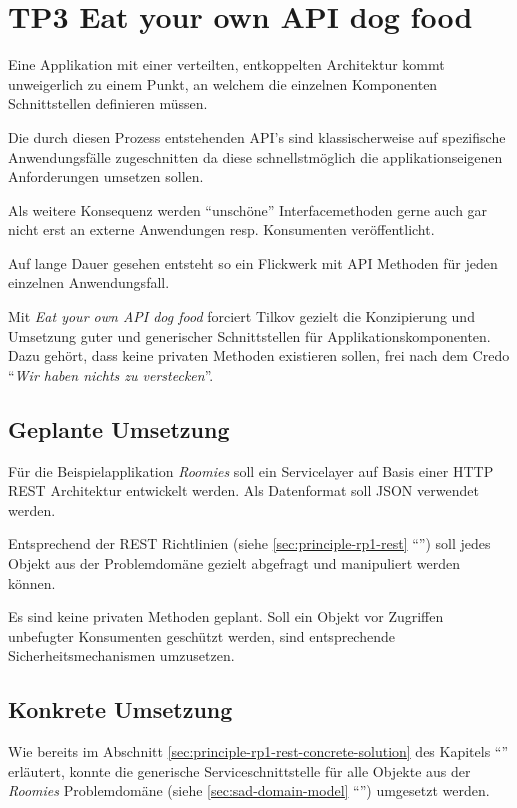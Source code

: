 \section{TP3 Eat your own API dog food}
\label{sec:principle-tp3-eat-your-own-api}

Eine Applikation mit einer verteilten, entkoppelten Architektur kommt unweigerlich zu einem Punkt, an welchem die einzelnen Komponenten Schnittstellen definieren müssen.

Die durch diesen Prozess entstehenden API's sind klassischerweise auf spezifische Anwendungsfälle zugeschnitten da diese schnellstmöglich die applikationseigenen Anforderungen umsetzen sollen.

Als weitere Konsequenz werden ``unschöne'' Interfacemethoden gerne auch gar nicht erst an externe Anwendungen resp. Konsumenten veröffentlicht.

Auf lange Dauer gesehen entsteht so ein Flickwerk mit API Methoden für jeden einzelnen Anwendungsfall.

Mit \emph{Eat your own API dog food} forciert Tilkov gezielt die Konzipierung und Umsetzung guter und generischer Schnittstellen für Applikationskomponenten. Dazu gehört, dass keine privaten Methoden existieren sollen, frei nach dem Credo ``\emph{Wir haben nichts zu verstecken}''.


\subsection*{Geplante Umsetzung}

Für die Beispielapplikation \emph{Roomies} soll ein Servicelayer auf Basis einer HTTP \gls{REST} Architektur entwickelt werden. Als Datenformat soll \gls{JSON} verwendet werden.

Entsprechend der \gls{REST} Richtlinien (siehe \ref{sec:principle-rp1-rest} ``'') soll jedes Objekt aus der Problemdomäne gezielt abgefragt und manipuliert werden können.

Es sind keine privaten Methoden geplant. Soll ein Objekt vor Zugriffen unbefugter Konsumenten geschützt werden, sind entsprechende Sicherheitsmechanismen umzusetzen.


\subsection*{Konkrete Umsetzung}

Wie bereits im Abschnitt \ref{sec:principle-rp1-rest-concrete-solution} des Kapitels ``'' erläutert, konnte die generische Serviceschnittstelle für alle Objekte aus der \emph{Roomies} Problemdomäne (siehe \ref{sec:sad-domain-model} ``'') umgesetzt werden.


